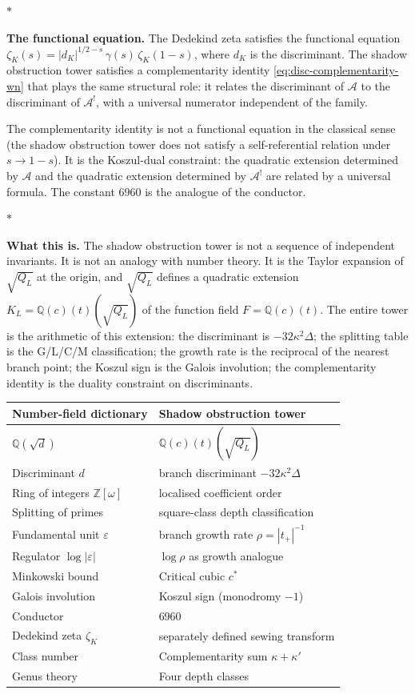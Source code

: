\documentclass[11pt]{article}
\newcommand{\cA}{\mathcal{A}}
\newcommand{\Z}{\mathbb{Z}}
\newcommand{\Q}{\mathbb{Q}}
\newcommand{\sep}{\bigskip\begin{center}$*$\end{center}\medskip}
\begin{document}
\sep

\noindent\textbf{The functional equation.}\enspace
The Dedekind zeta satisfies the functional equation
$\zeta_K(s) = |d_K|^{1/2-s}\,\gamma(s)\,\zeta_K(1{-}s)$,
where $d_K$ is the discriminant.  The shadow obstruction tower satisfies
a complementarity identity
\eqref{eq:disc-complementarity-wn} that plays the same
structural role: it relates the discriminant of $\cA$ to
the discriminant of $\cA^!$, with a universal numerator
independent of the family.

The complementarity identity is not a functional equation in
the classical sense (the shadow obstruction tower does not satisfy a
self-referential relation under $s \to 1-s$).  It is the
Koszul-dual constraint: the quadratic extension determined
by $\cA$ and the quadratic extension determined by $\cA^!$
are related by a universal formula.  The constant $6960$ is
the analogue of the conductor.

\sep

\noindent\textbf{What this is.}\enspace
The shadow obstruction tower is not a sequence of independent invariants.
It is not an analogy with number theory.  It is the Taylor
expansion of $\sqrt{Q_L}$ at the origin, and $\sqrt{Q_L}$
defines a quadratic extension $K_L = \Q(c)(t)(\sqrt{Q_L})$
of the function field $F = \Q(c)(t)$.  The entire tower is
the arithmetic of this extension: the discriminant is
$-32\kappa^2\Delta$; the splitting table is the G/L/C/M
classification; the growth rate is the reciprocal of the
nearest branch point; the Koszul sign is the Galois involution;
the complementarity identity is the duality constraint on
discriminants.

\begin{center}
\small
\renewcommand{\arraystretch}{1.15}
\begin{tabular}{@{}ll@{}}
\textbf{Number-field dictionary} & \textbf{Shadow obstruction tower} \\
\hline
$\Q(\sqrt{d})$ & $\Q(c)(t)(\sqrt{Q_L})$ \\[3pt]
Discriminant $d$ & branch discriminant $-32\kappa^2\Delta$ \\[3pt]
Ring of integers $\Z[\omega]$ & localised coefficient order \\[3pt]
Splitting of primes & square-class depth classification \\[3pt]
Fundamental unit $\varepsilon$ & branch growth rate $\rho=|t_+|^{-1}$ \\[3pt]
Regulator $\log|\varepsilon|$ & $\log\rho$ as growth analogue \\[3pt]
Minkowski bound & Critical cubic $c^*$ \\[3pt]
Galois involution & Koszul sign (monodromy $-1$) \\[3pt]
Conductor & $6960$ \\[3pt]
Dedekind zeta $\zeta_K$ & separately defined sewing transform \\[3pt]
Class number & Complementarity sum $\kappa + \kappa'$ \\[3pt]
Genus theory & Four depth classes
\end{tabular}
\end{center}
\end{document}
